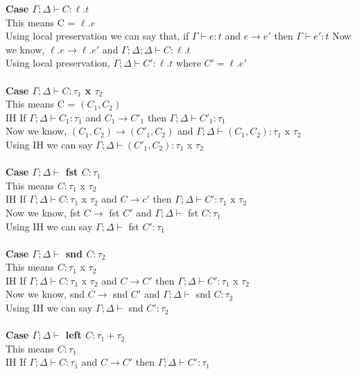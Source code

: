\documentclass{article}
\begin{document}
\textbf{Case $\Gamma; \Delta \vdash C : \ell.t$}       \\ 
This means C = $\ell.e$ \\
Using local preservation we can say that, if $\Gamma \vdash e : t$ and  $e \to e'$ then $\Gamma \vdash e' : t$
Now we know, $\ell.e \to \ell.e'$ and $\Gamma; \Delta; \Delta \vdash C : \ell.t$  \\
Using local preservation, $\Gamma;\Delta \vdash C' : \ell.t$ where $C' = \ell.e'$
\\ \\
\textbf{Case $\Gamma;\Delta \vdash C : \tau_1 $ x $ \tau_2$ } \\
This means C = $(C_1, C_2)$ \\
IH If $\Gamma; \Delta \vdash C_1 : \tau_1$ and  $C_1 \to C'_1$ then $\Gamma;\Delta \vdash C'_1 : \tau_1$ \\
Now we know, $(C_1,C_2) \to (C'_1, C_2)$ and $\Gamma; \Delta \vdash (C_1, C_2) : \tau_1$ x $\tau_2$ \\
Using IH we can say $\Gamma;\Delta \vdash (C'_1, C_2) : \tau_1$ x $ \tau_2$ \\\\
\textbf{Case $\Gamma; \Delta\vdash$ fst $C : \tau_1$ } \\
This means $C : \tau_1$ x $\tau_2$ \\
IH If $\Gamma; \Delta \vdash C : \tau_1$ x $\tau_2$ and  $C \to c'$ then $\Gamma; \Delta \vdash C' : \tau_1$ x $\tau_2$ \\
Now we know, fst $C \to$ fst $C'$ and $\Gamma;\Delta \vdash$ fst $C : \tau_1$ \\
Using IH we can say $\Gamma; \Delta \vdash$ fst $ C' : \tau_1$ \\\\
\textbf{Case $\Gamma; \Delta \vdash$ snd $C : \tau_2$ } \\
This means $C : \tau_1$ x $\tau_2$ \\
IH If $\Gamma; \Delta \vdash C : \tau_1$ x $\tau_2$ and  $C \to C'$ then $\Gamma; \Delta \vdash C' : \tau_1$ x $\tau_2$ \\
Now we know, snd $C \to$ snd $C'$ and $\Gamma; \Delta \vdash$ snd $C : \tau_2$ \\
Using IH we can say $\Gamma; \Delta \vdash$ snd $ C' : \tau_2$ \\\\
\textbf{Case $\Gamma; \Delta \vdash$ left $C : \tau_1+\tau_2$ } \\
This means $C : \tau_1$ \\
IH If $\Gamma; \Delta \vdash C : \tau_1$ and  $C \to C'$ then $\Gamma;\Delta \vdash C' : \tau_1$ \\
\end{document}
